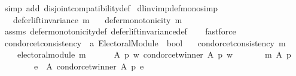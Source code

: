 \begin{isabellebody}
\ {\isacharparenleft}{\kern0pt}simp\ add{\isacharcolon}{\kern0pt}\ disjoint{\isacharunderscore}{\kern0pt}compatibility{\isacharunderscore}{\kern0pt}def{\isacharparenright}{\kern0pt}\isanewline
{}\isamarkupfalse%
%
\endisatagproof
{\isafoldproof}%
%
\isadelimproof
\isanewline
%
\endisadelimproof
\isanewline
\isanewline
{}\isamarkupfalse%
\ dl{\isacharunderscore}{\kern0pt}inv{\isacharunderscore}{\kern0pt}imp{\isacharunderscore}{\kern0pt}def{\isacharunderscore}{\kern0pt}mono{\isacharbrackleft}{\kern0pt}simp{\isacharbrackright}{\kern0pt}{\isacharcolon}{\kern0pt}\isanewline
\ \ \ {\isachardoublequoteopen}defer{\isacharunderscore}{\kern0pt}lift{\isacharunderscore}{\kern0pt}invariance\ m{\isachardoublequoteclose}\isanewline
\ \ \ {\isachardoublequoteopen}defer{\isacharunderscore}{\kern0pt}monotonicity\ m{\isachardoublequoteclose}\isanewline
%
\isadelimproof
\ \ %
\endisadelimproof
%
\isatagproof
{}\isamarkupfalse%
\ assms\ defer{\isacharunderscore}{\kern0pt}monotonicity{\isacharunderscore}{\kern0pt}def\ defer{\isacharunderscore}{\kern0pt}lift{\isacharunderscore}{\kern0pt}invariance{\isacharunderscore}{\kern0pt}def\isanewline
\ \ \isamarkupfalse%
\ fastforce%
\endisatagproof
{\isafoldproof}%
%
\isadelimproof
%
\endisadelimproof
%
\isadelimdocument
%
\endisadelimdocument
%
\isatagdocument
%
\isamarkuptrue%
%
\isamarkuptrue%
%
\endisatagdocument
{\isafolddocument}%
%
\isadelimdocument
%
\endisadelimdocument
{}\isamarkupfalse%
\ condorcet{\isacharunderscore}{\kern0pt}consistency\ {\isacharcolon}{\kern0pt}{\isacharcolon}{\kern0pt}\ {\isachardoublequoteopen}{\isacharprime}{\kern0pt}a\ Electoral{\isacharunderscore}{\kern0pt}Module\ {\isasymRightarrow}\ bool{\isachardoublequoteclose}\ \isanewline
\ \ {\isachardoublequoteopen}condorcet{\isacharunderscore}{\kern0pt}consistency\ m\ {\isasymequiv}\isanewline
\ \ \ \ electoral{\isacharunderscore}{\kern0pt}module\ m\ {\isasymand}\isanewline
\ \ \ \ {\isacharparenleft}{\kern0pt}{\isasymforall}\ A\ p\ w{\isachardot}{\kern0pt}\ condorcet{\isacharunderscore}{\kern0pt}winner\ A\ p\ w\ {\isasymlongrightarrow}\isanewline
\ \ \ \ \ \ {\isacharparenleft}{\kern0pt}m\ A\ p\ {\isacharequal}{\kern0pt}\isanewline
\ \ \ \ \ \ \ \ {\isacharparenleft}{\kern0pt}{\isacharbraceleft}{\kern0pt}e\ {\isasymin}\ A{\isachardot}{\kern0pt}\ condorcet{\isacharunderscore}{\kern0pt}winner\ A\ p\ e{\isacharbraceright}{\kern0pt}{\isacharcomma}{\kern0pt}\isanewline

\end{isabellebody}
